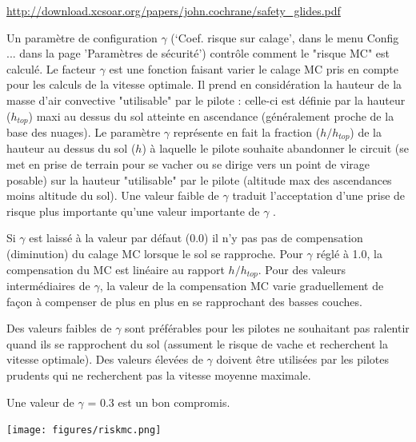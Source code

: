 \url{http://download.xcsoar.org/papers/john.cochrane/safety_glides.pdf}

Un paramètre de configuration $\gamma$ (`Coef. risque sur calage', dans le menu Config ... dans la page 'Paramètres de sécurité')  contrôle comment le "risque MC" est calculé. Le facteur $\gamma$ est une fonction faisant varier le calage MC pris en compte pour les calculs de la vitesse optimale. Il prend en considération la hauteur de la masse d'air convective "utilisable" par le pilote : celle-ci est définie par la hauteur ($h_{top}$) maxi au dessus du sol atteinte en ascendance (généralement proche de la base des nuages). Le paramètre $\gamma$ représente en fait la fraction ($h/h_{top}$) de la hauteur au dessus du sol  ($h$) à laquelle le pilote souhaite abandonner le circuit (se met en prise de terrain pour se vacher ou se dirige vers un point de virage posable) sur la hauteur "utilisable" par le pilote (altitude max des ascendances moins altitude du sol). Une valeur faible de $\gamma$  traduit l'acceptation d'une prise de risque plus importante qu'une valeur importante de  $\gamma$ .

Si  $\gamma$  est laissé à la valeur par défaut (0.0) il n'y pas pas de compensation (diminution) du calage MC lorsque le sol se rapproche. Pour  $\gamma$  réglé à 1.0, la compensation du MC est linéaire au rapport   $h/h_{top}$. Pour des valeurs intermédiaires de  $\gamma$, la valeur de la compensation MC varie graduellement de façon à compenser de plus en plus en se rapprochant des basses couches.

Des valeurs faibles de  $\gamma$  sont préférables pour les pilotes ne souhaitant pas ralentir quand ils se rapprochent du sol (assument le risque de vache et recherchent la vitesse optimale). Des valeurs élevées de  $\gamma$  doivent être utilisées par les pilotes prudents qui ne recherchent pas la vitesse moyenne maximale.

Une valeur de  $\gamma$  = 0.3 est un bon compromis.

\begin{center}
\texttt{[image: figures/riskmc.png]}
\end{center}

